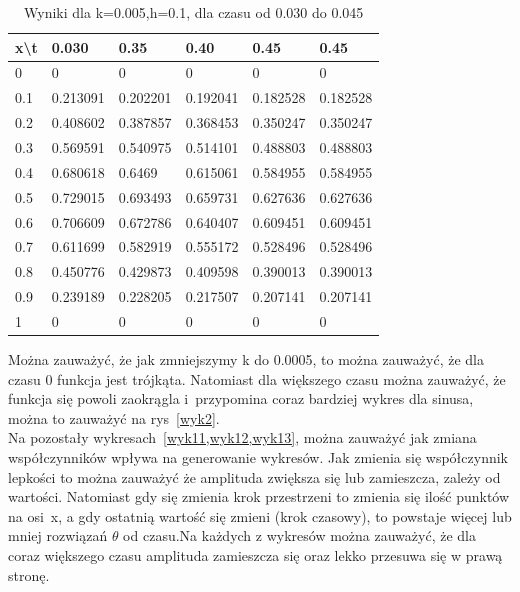\documentclass[a4paper,11pt]{article}
\begin{document}
\begin{table}[]
	\begin{tabular}{|l|l|l|l|l|l|}
		\hline
		x\textbackslash{}t & 0.030    & 0.35     & 0.40     & 0.45     & 0.45     \\ \hline
		0                  & 0        & 0        & 0        & 0        & 0        \\ \hline
		0.1                & 0.213091 & 0.202201 & 0.192041 & 0.182528 & 0.182528 \\ \hline
		0.2                & 0.408602 & 0.387857 & 0.368453 & 0.350247 & 0.350247 \\ \hline
		0.3                & 0.569591 & 0.540975 & 0.514101 & 0.488803 & 0.488803 \\ \hline
		0.4                & 0.680618 & 0.6469   & 0.615061 & 0.584955 & 0.584955 \\ \hline
		0.5                & 0.729015 & 0.693493 & 0.659731 & 0.627636 & 0.627636 \\ \hline
		0.6                & 0.706609 & 0.672786 & 0.640407 & 0.609451 & 0.609451 \\ \hline
		0.7                & 0.611699 & 0.582919 & 0.555172 & 0.528496 & 0.528496 \\ \hline
		0.8                & 0.450776 & 0.429873 & 0.409598 & 0.390013 & 0.390013 \\ \hline
		0.9                & 0.239189 & 0.228205 & 0.217507 & 0.207141 & 0.207141 \\ \hline
		1                  & 0        & 0        & 0        & 0        & 0        \\ \hline
	\end{tabular}
		\caption{Wyniki dla k=0.005,h=0.1, dla czasu od 0.030 do 0.045}
	\label{tab2}
\end{table}
Można zauważyć, że jak zmniejszymy k do 0.0005, to można zauważyć, że dla czasu 0 funkcja jest trójkąta. Natomiast dla większego czasu można zauważyć, że funkcja się powoli zaokrągla i~przypomina coraz bardziej wykres dla sinusa, można to zauważyć na rys~\ref{wyk2}. \\
Na pozostały wykresach~\ref{wyk11,wyk12,wyk13}, można zauważyć jak zmiana współczynników wpływa na generowanie wykresów. Jak zmienia się współczynnik lepkości to można zauważyć że amplituda zwiększa się lub zamieszcza, zależy od wartości. Natomiast gdy się zmienia krok przestrzeni to zmienia się ilość punktów na osi~x, a gdy ostatnią wartość się zmieni (krok czasowy), to powstaje więcej lub mniej rozwiązań $\theta$ od czasu.Na każdych z wykresów można zauważyć, że dla coraz większego czasu amplituda zamieszcza się oraz lekko przesuwa się w prawą stronę.\\
\end{document}
